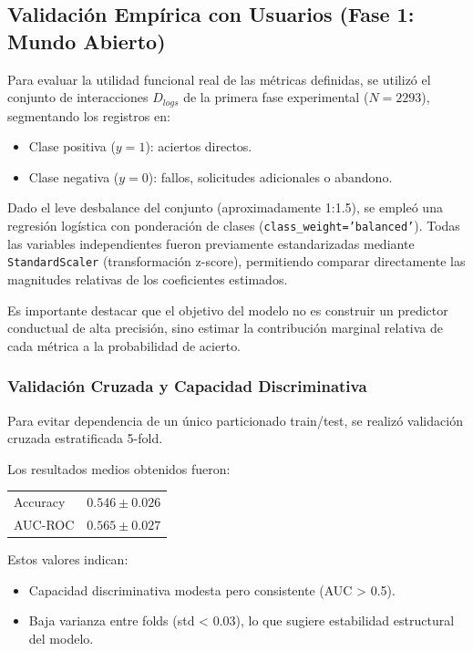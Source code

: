 \subsection{Validación Empírica con Usuarios (Fase 1: Mundo Abierto)}

Para evaluar la utilidad funcional real de las métricas definidas, se utilizó el conjunto de interacciones $D_{logs}$ de la primera fase experimental ($N = 2293$), segmentando los registros en:

\begin{itemize}
\item Clase positiva ($y=1$): aciertos directos.
\item Clase negativa ($y=0$): fallos, solicitudes adicionales o abandono.
\end{itemize}

Dado el leve desbalance del conjunto (aproximadamente 1:1.5), se empleó una regresión logística con ponderación de clases (\texttt{class\_weight='balanced'}). Todas las variables independientes fueron previamente estandarizadas mediante \texttt{StandardScaler} (transformación z-score), permitiendo comparar directamente las magnitudes relativas de los coeficientes estimados.

Es importante destacar que el objetivo del modelo no es construir un predictor conductual de alta precisión, sino estimar la contribución marginal relativa de cada métrica a la probabilidad de acierto.

\subsubsection{Validación Cruzada y Capacidad Discriminativa}

Para evitar dependencia de un único particionado train/test, se realizó validación cruzada estratificada 5-fold.

Los resultados medios obtenidos fueron:

\begin{center}
\begin{tabular}{|l|c|}
\hline
Accuracy & $0.546 \pm 0.026$ \\
AUC-ROC & $0.565 \pm 0.027$ \\
\hline
\end{tabular}
\end{center}

Estos valores indican:

\begin{itemize}
\item Capacidad discriminativa modesta pero consistente (AUC > 0.5).
\item Baja varianza entre folds (std < 0.03), lo que sugiere estabilidad estructural del modelo.
\end{itemize}

